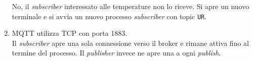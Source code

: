 \documentclass{article}
\begin{document}
\begin{enumerate}[label=\textbf{(\arabic*)}]
No, il \emph{subscriber} interessato alle temperature non lo riceve. Si
apre un nuovo terminale e si avvia un nuovo processo \emph{subscriber}
con topic \texttt{UR}.

\item
MQTT utilizza TCP con porta 1883.\\
Il \emph{subscriber} apre una sola connessione verso il broker e rimane
attiva fino al termine del processo. Il \emph{publisher} invece ne apre
una a ogni \emph{publish}.
\end{enumerate}
\end{document}
